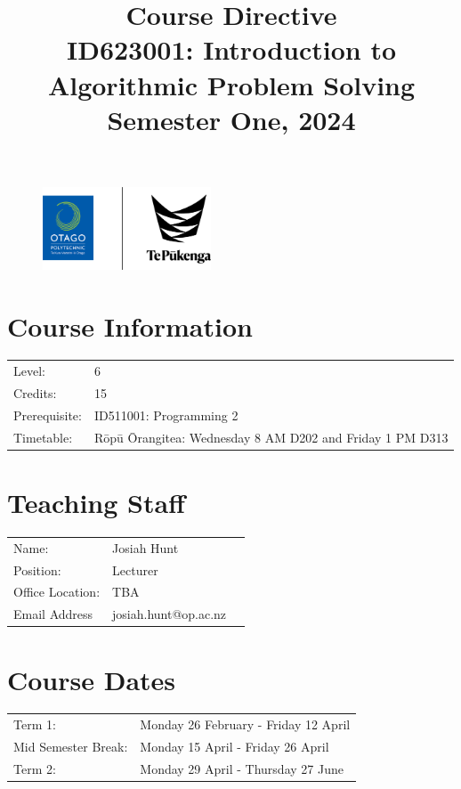 \documentclass{article}
\author{}
\begin{document}
\begin{figure}
	\includegraphics[width=50mm]{../img/logo.png} 
\end{figure}

\title{Course Directive\\ID623001: Introduction to Algorithmic Problem Solving\\Semester One, 2024}
\date{}
\maketitle

\section*{Course Information}
\begin{tabular}{ll}
	Level: & 6 \\
	Credits:      & 15                                                              \\
	Prerequisite: & ID511001: Programming 2                                                   \\
	Timetable:    & Rōpū Ōrangitea: Wednesday 8 AM D202 and Friday 1 PM D313               
\end{tabular}

\section*{Teaching Staff}
\begin{tabular}{lll}
	Name:            & Josiah Hunt                         \\
	Position:        & Lecturer\\
	Office Location: & TBA                                 \\
	Email Address    & josiah.hunt@op.ac.nz                  
\end{tabular}

\section*{Course Dates}
\begin{tabular}{ll}
	Term 1:           & Monday 26 February - Friday 12 April  \\
	Mid Semester Break: &  Monday 15 April  - Friday 26 April     \\
	Term 2:             & Monday 29 April - Thursday 27 June       \\
\end{tabular}
\end{document}
